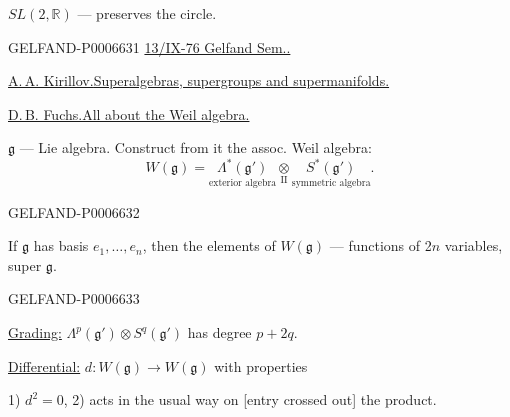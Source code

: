 \(SL(2,\mathbb R)\) --- preserves the circle.


\begin{GelfandAdjacentEvidence}{GELFAND-P000663}{1}
\underline{13/IX-76 }\quad\underline{Gelfand Sem..}

\underline{\underline{A.\,A. Kirillov.}}\quad\underline{Superalgebras, supergroups and supermanifolds.}

\underline{D.\,B. Fuchs.}\quad\underline{All about the Weil algebra.}

\(\mathfrak g\) --- Lie algebra. Construct from it the assoc. Weil algebra:
\[
W(\mathfrak g)
=\underset{\text{exterior algebra}}{\Lambda^*(\mathfrak g')}
 \underset{\mathrm{II}}{\otimes}
 \underset{\text{symmetric algebra}}{S^*(\mathfrak g')}.
\]
\end{GelfandAdjacentEvidence}
\begin{GelfandAdjacentEvidence}{GELFAND-P000663}{2}


If \(\mathfrak g\) has basis \(e_1,\ldots,e_n\), then the elements of \(W(\mathfrak g)\) ---
functions of 2\(n\) variables, super \(\mathfrak g\).
\end{GelfandAdjacentEvidence}
\begin{GelfandAdjacentEvidence}{GELFAND-P000663}{3}


\underline{Grading:} \(\Lambda^p(\mathfrak g')\otimes S^q(\mathfrak g')\)
has degree \(p+2q\).

\underline{Differential:} \(d:W(\mathfrak g)\to W(\mathfrak g)\) with properties

1) \(d^2=0\), 2) acts in the usual way on [entry crossed out] the product.
\end{GelfandAdjacentEvidence}
